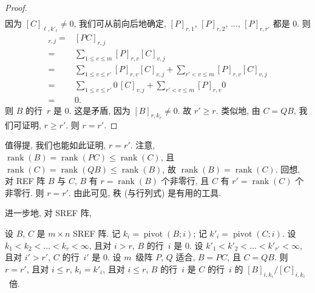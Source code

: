 \documentclass[../libro.tex]{subfiles}
\begin{document}
\begin{proof}
\begin{equation*}
\begin{alignedat}{7}
        \end{alignedat}
    \end{equation*}
    因为 \([C]_{\ell,k'_\ell} \neq 0\),
    我们可从前向后地确定,
    \([P]_{r,1}\), \([P]_{r,2}\), \(\dots\), \([P]_{r,r'}\)
    都是 \(0\).
    则
    \begin{align*}
        [B]_{r,j}
        = {} &
        [P C]_{r,j}
        \\
        = {} &
        \sum_{1 \leq v \leq m}
        {[P]_{r,v} [C]_{v,j}}
        \\
        = {} &
        \sum_{1 \leq v \leq r'}
        {[P]_{r,v} [C]_{v,j}}
        +
        \sum_{r' < v \leq m}
        {[P]_{r,v} [C]_{v,j}}
        \\
        = {} &
        \sum_{1 \leq v \leq r'}
        {0\, [C]_{v,j}}
        +
        \sum_{r' < v \leq m}
        {[P]_{r,v} 0}
        \\
        = {} &
        0.
    \end{align*}
    则 \(B\) 的行~\(r\) 是 \(0\).
    这是矛盾, 因为 \([B]_{r,k_r} \neq 0\).
    故 \(r' \geq r\).
    类似地, 由 \(C = Q B\),
    我们可证明, \(r \geq r'\).
    则 \(r = r'\).
\end{proof}

值得提, 我们也能如此证明, \(r = r'\).
注意,
\(\operatorname{rank} {(B)}
    = \operatorname{rank} {(P C)}
\leq \operatorname{rank} {(C)}\),
且
\(\operatorname{rank} {(C)}
    = \operatorname{rank} {(Q B)}
\leq \operatorname{rank} {(B)}\),
故 \(\operatorname{rank} {(B)}
= \operatorname{rank} {(C)}\).
回想, 对 REF 阵 \(B\) 与 \(C\),
\(B\) 有 \(r = \operatorname{rank} {(B)}\) 个非零行,
且 \(C\) 有 \(r' = \operatorname{rank} {(C)}\) 个非零行.
则 \(r = r'\).
由此可见, 秩 (与行列式) 是有用的工具.

进一步地, 对 SREF 阵,

\begin{theorem}
    设 \(B\), \(C\) 是 \(m \times n\) SREF 阵.
    记 \(k_i = \operatorname{pivot} {(B; i)}\);
    记 \(k'_i = \operatorname{pivot} {(C; i)}\).
    设 \(k_1 < k_2 < \dots < k_r < \infty\),
    且对 \(i > r\), \(B\) 的行~\(i\) 是 \(0\).
    设 \(k'_1 \allowbreak
        < k'_2 \allowbreak
        < \dots \allowbreak
        < k'_{r'} \allowbreak
    < \infty\),
    且对 \(i' > r'\), \(C\) 的行~\(i'\) 是 \(0\).
    设 \(m\)~级阵 \(P\), \(Q\) 适合,
    \(B = PC\), 且 \(C = QB\).
    则 \(r = r'\),
    且对 \(i \leq r\),
    \(k_i = k'_i\),
    且对 \(i \leq r\),
    \(B\) 的行~\(i\) 是 \(C\) 的行~\(i\) 的
    \([B]_{i,k_i} / [C]_{i,k_i}\)~倍.
\end{theorem}
\end{document}
